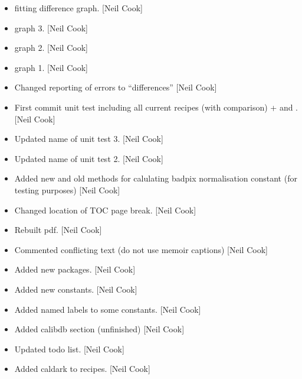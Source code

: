 \documentclass[a4paper,10pt,english]{report}
\begin{document}
\begin{itemize}
\item {} 
 fitting difference graph. {[}Neil Cook{]}

\item {} 
 graph 3. {[}Neil Cook{]}

\item {} 
 graph 2. {[}Neil Cook{]}

\item {} 
 graph 1. {[}Neil Cook{]}

\item {} 
Changed reporting of errors to “differences” {[}Neil Cook{]}

\item {} 
First commit unit test including all current recipes (with comparison)
+  and . {[}Neil Cook{]}

\item {} 
Updated name of unit test 3. {[}Neil Cook{]}

\item {} 
Updated name of unit test 2. {[}Neil Cook{]}

\item {} 
Added new and old methods for calulating badpix normalisation constant
(for testing purposes) {[}Neil Cook{]}

\item {} 
Changed location of TOC page break. {[}Neil Cook{]}

\item {} 
Rebuilt pdf. {[}Neil Cook{]}

\item {} 
Commented conflicting text (do not use memoir captions) {[}Neil Cook{]}

\item {} 
Added new packages. {[}Neil Cook{]}

\item {} 
Added new constants. {[}Neil Cook{]}

\item {} 
Added named labels to some constants. {[}Neil Cook{]}

\item {} 
Added calibdb section (unfinished) {[}Neil Cook{]}

\item {} 
Updated todo list. {[}Neil Cook{]}

\item {} 
Added caldark to recipes. {[}Neil Cook{]}


\end{itemize}
\end{document}
